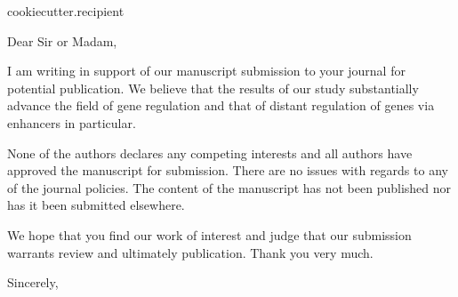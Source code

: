 \documentclass[a4paper]{scrlttr2}
\begin{document}
\begin{letter}{
  {{cookiecutter.recipient}}
}

\opening{Dear Sir or Madam,}

\thispagestyle{firststyle}

I am writing in support of our manuscript submission to your journal
for potential publication. We believe that the results of our study
substantially advance the field of gene regulation and that of distant
regulation of genes via enhancers in particular. 

None of the authors declares any competing interests and all authors have
approved the manuscript for submission. 
There are no issues with regards to any of the journal policies.
The content of the manuscript has not been published nor has it been submitted elsewhere.

We hope that you find our work of interest and judge that our submission
warrants review and ultimately publication. 
Thank you very much.


\bigskip
\bigskip
\closing{Sincerely,}

\end{letter}

\end{document}
